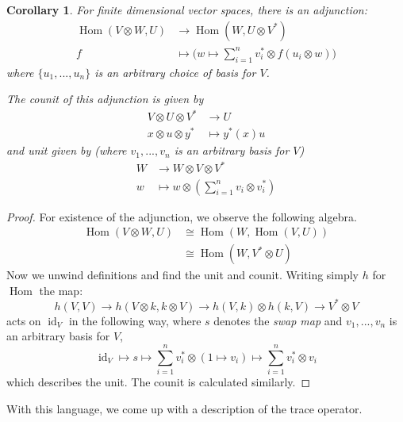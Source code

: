\documentclass[12pt]{article}
\theoremstyle{plain}
\newtheorem{cor}[thm]{Corollary}
\theoremstyle{definition}
\newcommand{\lto}{\longrightarrow}
\begin{document}
	\begin{cor}
		For finite dimensional vector spaces, there is an adjunction:
		\begin{align}\label{eq:tensor_dual_adjunction}
			\operatorname{Hom}(V \otimes W, U) &\lto \operatorname{Hom}(W, U \otimes V^\ast)\\
			f &\longmapsto \big(w \mapsto \sum_{i = 1}^n v_i^\ast \otimes f(u_i \otimes w)\big)
		\end{align}
	where $\lbrace u_1,...,u_n\rbrace$ is an arbitrary choice of basis for $V$.
	
		The counit of this adjunction is given by
		\begin{align*}
			V \otimes U \otimes V^\ast &\lto U\\
			x \otimes u \otimes y^\ast &\longmapsto y^\ast(x )u
		\end{align*}
		and unit given by (where $v_1,...,v_n$ is an arbitrary basis for $V$)
		\begin{align*}
			W &\lto W \otimes V \otimes V^\ast\\
			w &\longmapsto w \otimes (\sum_{i = 1}^n v_i \otimes v_i^\ast)
		\end{align*}
	\end{cor}
	\begin{proof}
		For existence of the adjunction, we observe the following algebra.
		\begin{align}
			\operatorname{Hom}(V \otimes W, U) &\cong \operatorname{Hom}(W, \operatorname{Hom}(V,U))\\
			&\cong \operatorname{Hom}(W, V^\ast \otimes U )
		\end{align}
		Now we unwind definitions and find the unit and counit. Writing simply $h$ for $\operatorname{Hom}$ the map:
		\begin{equation}
			h(V,V) \lto h(V \otimes k, k \otimes V) \lto h(V,k) \otimes h(k,V) \lto V^\ast \otimes V
		\end{equation}
		acts on $\operatorname{id}_V$ in the following way, where $s$ denotes the \emph{swap map} and $v_1,...,v_n$ is an arbitrary basis for $V$,
		\begin{equation}
			\operatorname{id}_V \longmapsto s \longmapsto \sum_{i = 1}^n v_i^\ast \otimes (1 \mapsto v_i) \longmapsto \sum_{i = 1}^nv_i^\ast \otimes v_i
		\end{equation}
		which describes the unit. The counit is calculated similarly.
	\end{proof}
	With this language, we come up with a description of the trace operator.
\end{document}
